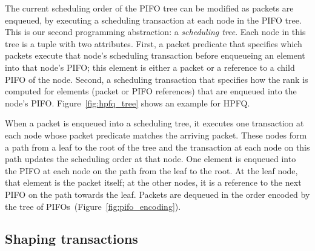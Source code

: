 The current scheduling order of the PIFO tree can be modified as packets are
enqueued, by executing a scheduling transaction at each node in the PIFO tree.
This is our second programming abstraction: a {\em scheduling tree}.  Each node
in this tree is a tuple with two attributes. First, a packet predicate that
specifies which packets execute that node's scheduling transaction before
enqueueing an element into that node's PIFO; this element is either a packet or
a reference to a child PIFO of the node.  Second, a scheduling transaction that
specifies how the rank is computed for elements (packet or PIFO references)
that are enqueued into the node's PIFO. Figure~\ref{fig:hpfq_tree} shows an
example for HPFQ.

When a packet is enqueued into a scheduling tree, it executes one transaction
at each node whose packet predicate matches the arriving packet. These nodes
form a path from a leaf to the root of the tree and the transaction at each
node on this path updates the scheduling order at that node. One element is
enqueued into the PIFO at each node on the path from the leaf to the root. At
the leaf node, that element is the packet itself; at the other nodes, it is a
reference to the next PIFO on the path towards the leaf. Packets are dequeued
in the order encoded by the tree of PIFOs~(Figure~\ref{fig:pifo_encoding}).

\subsection{Shaping transactions}
\label{ss:hshaping}

